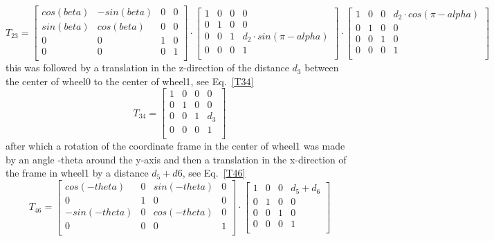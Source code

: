 \begin{equation}
    T_{23} =
    \begin{bmatrix}
    cos(beta)&-sin(beta)&0&0\\
    sin(beta)&cos(beta)&0&0\\
    0&0&1&0\\
    0&0&0&1\\
    \end{bmatrix}
    \cdot
    \begin{bmatrix}
    1&0&0&0\\
    0&1&0&0\\
    0&0&1&d_2\cdot sin(\pi-alpha)\\
    0&0&0&1\\
    \end{bmatrix}
    \cdot
    \begin{bmatrix}
    1&0&0&d_2\cdot cos(\pi-alpha)\\
    0&1&0&0\\
    0&0&1&0\\
    0&0&0&1\\
    \end{bmatrix}
    \label{T23}
\end{equation}
this was followed by a translation in the z-direction of the distance \(d_3\) between the center of wheel0 to the center of wheel1, see Eq.~\eqref{T34}
\begin{equation}
    T_{34} =
    \begin{bmatrix}
    1&0&0&0\\
    0&1&0&0\\
    0&0&1&d_3\\
    0&0&0&1\\
    \end{bmatrix}
    \label{T34}
\end{equation}
after which a rotation of the coordinate frame in the center of wheel1 was made by an angle -theta around the y-axis and then a translation in the x-direction of the frame in wheel1 by a distance \(d_5 + d6\), see Eq.~\eqref{T46}
\begin{equation}
    T_{46} =
    \begin{bmatrix}
    cos(-theta)&0&sin(-theta)&0\\
    0&1&0&0\\
    -sin(-theta)&0&cos(-theta)&0\\
    0&0&0&1\\
    \end{bmatrix}
    \cdot
     \begin{bmatrix}
    1&0&0&d_5 + d_6\\
    0&1&0&0\\
    0&0&1&0\\
    0&0&0&1\\
    \end{bmatrix}
    \label{T46}
\end{equation}
